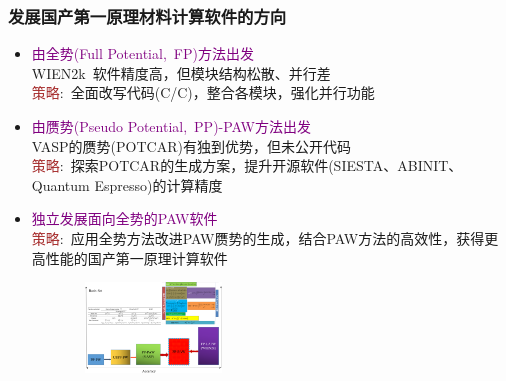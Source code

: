 \documentclass[cjk,slidestop,compress,mathserif,blue]{beamer}
\begin{document}
\frame
{
	\frametitle{发展国产第一原理材料计算软件的方向}
	\begin{itemize}
		\item \textcolor{purple}{由全势(\textrm{Full Potential,~FP})方法出发}\\
			\textrm{WIEN2k}~软件精度高，但模块结构松散、并行差\\
			\textcolor{brown}{策略}:~全面改写代码(\textrm{C/C{\fontsize{7.2pt}{5.2pt}\selectfont{++}}})，整合各模块，强化并行功能
		\item \textcolor{purple}{由赝势(\textrm{Pseudo Potential,~PP})-\textrm{PAW}方法出发}\\
			\textrm{VASP}的赝势(\textrm{POTCAR})有独到优势，但未公开代码\\
			\textcolor{brown}{策略}:~探索\textrm{POTCAR}的生成方案，提升开源软件(\textrm{SIESTA}、\textrm{ABINIT}、\textrm{Quantum Espresso})的计算精度
		\item \textcolor{purple}{独立发展面向全势的\textrm{PAW}软件}\\
			\textcolor{brown}{策略}:~应用全势方法改进\textrm{PAW}赝势的生成，结合\textrm{PAW}方法的高效性，获得更高性能的国产第一原理计算软件 
\begin{figure}[h!]
\vspace*{-0.04in}
\centering
\includegraphics[height=0.95in,width=1.70in,clip]{Figures/Method_Relation.png}
\label{Method-Relation}
\end{figure}
	\end{itemize}
}

\end{document}
